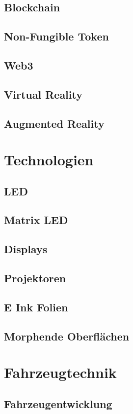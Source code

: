 \subsection{Blockchain}
\subsection{Non-Fungible Token}
\subsection{Web3}
\subsection{Virtual Reality}
\subsection{Augmented Reality}
\section{Technologien}
\subsection{LED}
\subsection{Matrix LED}
\subsection{Displays}
\subsection{Projektoren}
\subsection{E Ink Folien}
\subsection{Morphende Oberflächen}
\section{Fahrzeugtechnik}
\subsection{Fahrzeugentwicklung}
